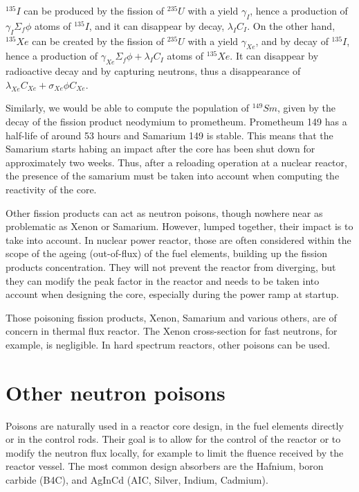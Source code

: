 $^{135}I$ can be produced by the fission of $^{235}U$ with a yield $\gamma_I$, hence a production of $\gamma_I\Sigma_f\phi$ atoms of $^{135}I$, and it can disappear by decay, $\lambda_I C_I$. On the other hand, $^{135}Xe$ can be created by the fission of $^{235}U$ with a yield $\gamma_{Xe}$, and by decay of $^{135}I$, hence a production of $\gamma_{Xe}\Sigma_f\phi + \lambda_I C_I$ atoms of $^{135}Xe$. It can disappear by radioactive decay and by capturing neutrons, thus a disappearance of $\lambda_{Xe} C_{Xe} + \sigma_{Xe}\phi C_{Xe}$.


Similarly, we would be able to compute the population of $^{149}Sm$, given by the decay of the fission product neodymium to prometheum. Prometheum 149 has a half-life of around 53 hours and Samarium 149 is stable. This means that the Samarium starts habing an impact after the core has been shut down for approximately two weeks. Thus, after a reloading operation at a nuclear reactor, the presence of the samarium must be taken into account when computing the reactivity of the core.

Other fission products can act as neutron poisons, though nowhere near as problematic as Xenon or Samarium. However, lumped together, their impact is to take into account. In nuclear power reactor, those are often considered within the scope of the ageing (out-of-flux) of the fuel elements, building up the fission products concentration. They will not prevent the reactor from diverging, but they can modify the peak factor in the reactor and needs to be taken into account when designing the core, especially during the power ramp at startup.

Those poisoning fission products, Xenon, Samarium and various others, are of concern in thermal flux reactor. The Xenon cross-section for fast neutrons, for example, is negligible. In hard spectrum reactors, other poisons can be used.

\section{Other neutron poisons}

Poisons are naturally used in a reactor core design, in the fuel elements directly or in the control rods. Their goal is to allow for the control of the reactor or to modify the neutron flux locally, for example to limit the fluence received by the reactor vessel. The most common design absorbers are the Hafnium, boron carbide (B4C), and AgInCd (AIC, Silver, Indium, Cadmium).


